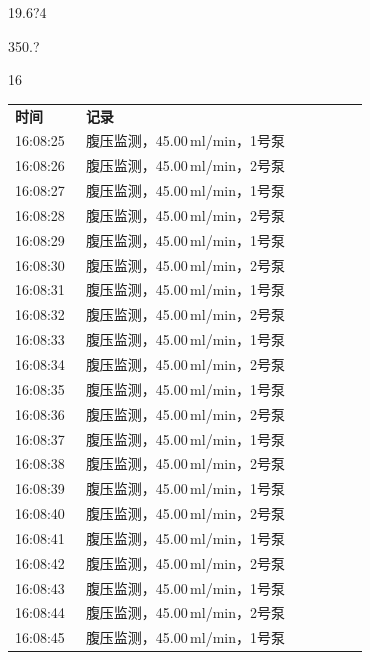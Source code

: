 \documentclass[UTF8,10pt,a4paper,fontset=fandol]{ctexart}
\newcommand{\fieldvalue}[1]{#1}
\newcommand{\handwritten}[1]{#1}
\begin{document}

\fieldvalue{\handwritten{19.6?4}}

\fieldvalue{\handwritten{350.?}}

\fieldvalue{\handwritten{16}}

\newpage

\begin{center}
\small
\begin{tabular}{p{0.18\linewidth}p{0.72\linewidth}}
\textbf{时间} & \textbf{记录}\\
16:08:25 & 腹压监测，45.00\,ml/min，1号泵\\
16:08:26 & 腹压监测，45.00\,ml/min，2号泵\\
16:08:27 & 腹压监测，45.00\,ml/min，1号泵\\
16:08:28 & 腹压监测，45.00\,ml/min，2号泵\\
16:08:29 & 腹压监测，45.00\,ml/min，1号泵\\
16:08:30 & 腹压监测，45.00\,ml/min，2号泵\\
16:08:31 & 腹压监测，45.00\,ml/min，1号泵\\
16:08:32 & 腹压监测，45.00\,ml/min，2号泵\\
16:08:33 & 腹压监测，45.00\,ml/min，1号泵\\
16:08:34 & 腹压监测，45.00\,ml/min，2号泵\\
16:08:35 & 腹压监测，45.00\,ml/min，1号泵\\
16:08:36 & 腹压监测，45.00\,ml/min，2号泵\\
16:08:37 & 腹压监测，45.00\,ml/min，1号泵\\
16:08:38 & 腹压监测，45.00\,ml/min，2号泵\\
16:08:39 & 腹压监测，45.00\,ml/min，1号泵\\
16:08:40 & 腹压监测，45.00\,ml/min，2号泵\\
16:08:41 & 腹压监测，45.00\,ml/min，1号泵\\
16:08:42 & 腹压监测，45.00\,ml/min，2号泵\\
16:08:43 & 腹压监测，45.00\,ml/min，1号泵\\
16:08:44 & 腹压监测，45.00\,ml/min，2号泵\\
16:08:45 & 腹压监测，45.00\,ml/min，1号泵\\

\end{tabular}
\end{center}
\end{document}
